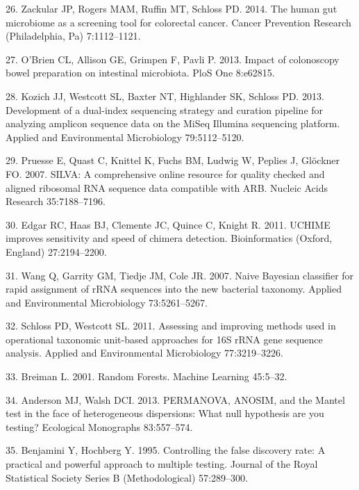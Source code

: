 \documentclass[12pt,]{article}
\begin{document}
\hypertarget{ref-zackular_human_2014}{}
26. Zackular JP, Rogers MAM, Ruffin MT, Schloss PD. 2014. The human gut
microbiome as a screening tool for colorectal cancer. Cancer Prevention
Research (Philadelphia, Pa) 7:1112--1121.

\hypertarget{ref-obrien_impact_2013}{}
27. O'Brien CL, Allison GE, Grimpen F, Pavli P. 2013. Impact of
colonoscopy bowel preparation on intestinal microbiota. PloS One
8:e62815.

\hypertarget{ref-kozich_development_2013}{}
28. Kozich JJ, Westcott SL, Baxter NT, Highlander SK, Schloss PD. 2013.
Development of a dual-index sequencing strategy and curation pipeline
for analyzing amplicon sequence data on the MiSeq Illumina sequencing
platform. Applied and Environmental Microbiology 79:5112--5120.

\hypertarget{ref-pruesse_silva_2007}{}
29. Pruesse E, Quast C, Knittel K, Fuchs BM, Ludwig W, Peplies J,
Glöckner FO. 2007. SILVA: A comprehensive online resource for quality
checked and aligned ribosomal RNA sequence data compatible with ARB.
Nucleic Acids Research 35:7188--7196.

\hypertarget{ref-edgar_uchime_2011}{}
30. Edgar RC, Haas BJ, Clemente JC, Quince C, Knight R. 2011. UCHIME
improves sensitivity and speed of chimera detection. Bioinformatics
(Oxford, England) 27:2194--2200.

\hypertarget{ref-wang_naive_2007}{}
31. Wang Q, Garrity GM, Tiedje JM, Cole JR. 2007. Naive Bayesian
classifier for rapid assignment of rRNA sequences into the new bacterial
taxonomy. Applied and Environmental Microbiology 73:5261--5267.

\hypertarget{ref-schloss_assessing_2011}{}
32. Schloss PD, Westcott SL. 2011. Assessing and improving methods used
in operational taxonomic unit-based approaches for 16S rRNA gene
sequence analysis. Applied and Environmental Microbiology 77:3219--3226.

\hypertarget{ref-breiman_random_2001}{}
33. Breiman L. 2001. Random Forests. Machine Learning 45:5--32.

\hypertarget{ref-anderson_permanova_2013}{}
34. Anderson MJ, Walsh DCI. 2013. PERMANOVA, ANOSIM, and the Mantel test
in the face of heterogeneous dispersions: What null hypothesis are you
testing? Ecological Monographs 83:557--574.

\hypertarget{ref-benjamini_controlling_1995}{}
35. Benjamini Y, Hochberg Y. 1995. Controlling the false discovery rate:
A practical and powerful approach to multiple testing. Journal of the
Royal Statistical Society Series B (Methodological) 57:289--300.
\end{document}
